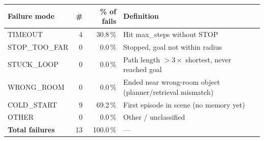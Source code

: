 \begin{tabular}{l@{\hspace{8pt}}rrl}
\toprule
\textbf{Failure mode} & \textbf{\#} & \textbf{\% of fails} & \textbf{Definition} \\
\midrule
TIMEOUT & 4 & 30.8\,\% & Hit max\_steps without STOP \\
STOP\_TOO\_FAR & 0 & 0.0\,\% & Stopped, goal not within radius \\
STUCK\_LOOP & 0 & 0.0\,\% & Path length $>3\times$ shortest, never reached goal \\
WRONG\_ROOM & 0 & 0.0\,\% & Ended near wrong-room object (planner/retrieval mismatch) \\
COLD\_START & 9 & 69.2\,\% & First episode in scene (no memory yet) \\
OTHER & 0 & 0.0\,\% & Other / unclassified \\
\midrule
\textbf{Total failures} & 13 & 100.0\,\% & --- \\
\bottomrule
\end{tabular}
